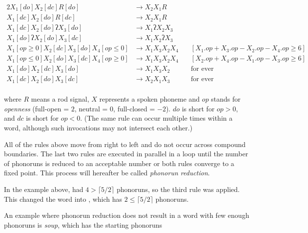 \documentclass{book}
\begin{document}
\begin{alignat*}{2}
  X_1[do] X_2[dc] R[do] &\rightarrow X_2 X_1 R \\
  X_1[dc] X_2[do] R[dc] &\rightarrow X_2 X_1 R \\
  X_1[dc] X_2[do] \text{ʔ} X_3[do] &\rightarrow X_1 \text{ʔ} X_2 X_3 \\
  X_1[do] \text{ʔ} X_2[do] X_3[dc] &\rightarrow X_1 X_2 \text{ʔ} X_3 \\
  X_1[op \ge 0] X_2[dc] X_3[do] X_4[op \le 0] &\rightarrow X_1 X_3 X_2 X_4 &\quad[X_1.op + X_3.op - X_2.op - X_4.op \ge 6] \\
  X_1[op \le 0] X_2[do] X_3[dc] X_4[op \ge 0] &\rightarrow X_1 X_3 X_2 X_4 &\quad[X_2.op + X_4.op - X_1.op - X_3.op \ge 6] \\
  X_1[do] X_2[dc] X_3[do] &\rightarrow X_1 X_3 X_2 &\quad\text{for ever} \\
  X_1[dc] X_2[do] X_3[dc] &\rightarrow X_2 X_1 X_3 &\quad\text{for ever} \\
\end{alignat*}

where $R$ means a rod signal, $X$ represents a spoken phoneme and $op$ stands for \emph{openness} (full-open = $2$, neutral = $0$, full-closed = $-2$). $do$ is short for $op > 0$, and $dc$ is short for $op < 0$. (The same rule can occur multiple times within a word, although such invocations may not intersect each other.)

All of the rules above move from right to left and do not occur across compound boundaries. The last two rules are executed in parallel in a loop until the number of phonoruns is reduced to an acceptable number or both rules converge to a fixed point. This process will hereafter be called \emph{phonorun reduction}.

In the example above,  had $4 > \lceil 5 / 2 \rceil$ phonoruns, so the third rule was applied. This changed the word into , which has $2 \le \lceil 5 / 2 \rceil$ phonoruns.

An example where phonorun reduction does not result in a word with few enough phonoruns is  \emph{soup}, which has the starting phonoruns

\begin{center}
\end{center}
\end{document}
